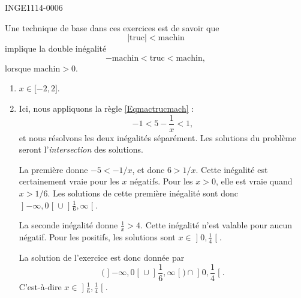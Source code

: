 

\begin{corrige}{INGE1114-0006}

	Une technique de base dans ces exercices est de savoir que
	\begin{equation}
		| \text{truc} |<\text{machin}
	\end{equation}
	implique la double inégalité
	\begin{equation}					\label{Eqmactrucmach}
		-\text{machin}<\text{truc}<\text{machin},
	\end{equation}
	lorsque $\text{machin}>0$.


	\begin{enumerate}

		\item
			$x\in\mathopen[ -2 , 2 \mathclose]$.
		\item
			Ici, nous appliquons la règle \eqref{Eqmactrucmach} :
			\begin{equation}
				-1<5-\frac{1}{ x }<1,
			\end{equation}
			et nous résolvons les deux inégalités séparément. Les solutions du problème seront l'\emph{intersection} des solutions. 

			La première donne $-5<-1/x$, et donc $6>1/x$. Cette inégalité est certainement vraie pour les $x$ négatifs. Pour les $x>0$, elle est vraie quand $x>1/6$. Les solutions de cette première inégalité sont donc $\mathopen] -\infty , 0 \mathclose[\cup\mathopen] \frac{1}{ 6 } , \infty \mathclose[$.

			La seconde inégalité donne $\frac{1}{ x }>4$. Cette inégalité n'est valable pour aucun négatif. Pour les positifs, les solutions sont $x\in\mathopen] 0 , \frac{1}{ 4 } \mathclose[$.

			La solution de l'exercice est donc donnée par
			\begin{equation}
				\Big(    \mathopen] -\infty , 0 \mathclose[\cup\mathopen] \frac{1}{ 6 } , \infty \mathclose[  \Big)\cap \mathopen] 0, \frac{1}{ 4 } \mathclose[.
			\end{equation}
			C'est-à-dire $x\in\mathopen] \frac{1}{ 6 } , \frac{1}{ 4 } \mathclose[$.



\end{enumerate}
\end{corrige}
